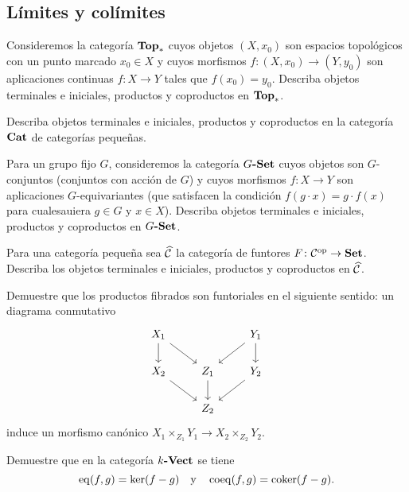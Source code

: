 \subsection*{Límites y colímites}

\begin{ejerc}
  Consideremos la categoría $\text{\bf Top}_*$ cuyos objetos $(X,x_0)$ son espacios
  topológicos con un punto marcado $x_0\in X$ y cuyos morfismos
  $f\colon (X,x_0)\to (Y,y_0)$ son aplicaciones continuas $f\colon X\to Y$ tales
  que $f (x_0) = y_0$. Describa objetos terminales e iniciales, productos y
  coproductos en $\text{\bf Top}_*$.
\end{ejerc}

\begin{ejerc}
  Describa objetos terminales e iniciales, productos y coproductos en la
  categoría $\text{\bf Cat}$ de categorías pequeñas.
\end{ejerc}

\begin{ejerc}
  Para un grupo fijo $G$, consideremos la categoría $G\text{\bf -Set}$ cuyos
  objetos son $G$-conjuntos (conjuntos con acción de $G$) y cuyos morfismos
  $f\colon X\to Y$ son aplicaciones $G$-equivariantes (que satisfacen la
  condición $f (g\cdot x) = g\cdot f (x)$ para cualesauiera $g\in G$ y
  $x\in X$). Describa objetos terminales e iniciales, productos y coproductos en
  $G\text{\bf -Set}$.
\end{ejerc}

\begin{ejerc}
  Para una categoría pequeña sea $\widehat{\mathcal{C}}$ la categoría de funtores
  $F\colon \mathcal{C}^\mathrm{op} \to \text{\bf Set}$. Describa los objetos
  terminales e iniciales, productos y coproductos en $\widehat{\mathcal{C}}$.
\end{ejerc}

\begin{ejerc}
  Demuestre que los productos fibrados son funtoriales en el siguiente sentido:
  un diagrama conmutativo
  \[ \begin{tikzcd}
      X_1\ar{dr}\ar[d] & & Y_1\ar{dl}\ar{d} \\
      X_2\ar{dr} & Z_1\ar{d} & Y_2\ar{dl} \\
      & Z_2
    \end{tikzcd} \]
  induce un morfismo canónico
  $X_1\times_{Z_1} Y_1 \to X_2 \times_{Z_2} Y_2$.
\end{ejerc}

\begin{ejerc}
  Demuestre que en la categoría $k\text{\bf -Vect}$ se tiene
  $$\operatorname{eq} (f,g) = \ker (f-g)\quad\text{y}\quad\operatorname{coeq} (f,g) = \operatorname{coker} (f-g).$$
\end{ejerc}

